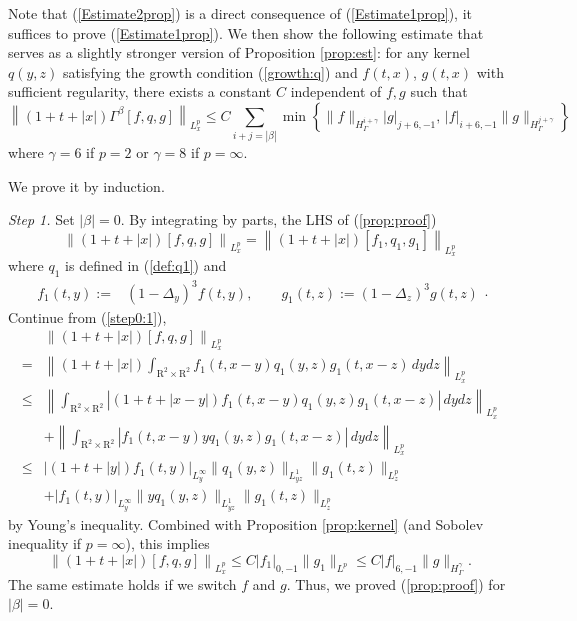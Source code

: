 \documentclass[12pt]{amsart}
\numberwithin{equation}{section} \numberwithin{theorem}{section}
\numberwithin{example}{section} \numberwithin{remark}{section}
\numberwithin{figure}{section} \numberwithin{algorithm}{section}
\def\be{\begin{equation}}
\def\ee{\end{equation}}
\def\mR{\mbox{R}}
\def\Gb{\Gamma^{\beta}}
\def\LGN{|}
\def\RGN#1{|_{#1}}
\def\LGNN{\|}
\def\RGNN#1{\|_{H^{#1}_{\Gamma}}}
\begin{document}
Note that (\ref{Estimate2prop}) is a direct consequence of
(\ref{Estimate1prop}), it suffices to prove (\ref{Estimate1prop}).
We then show the following estimate that serves as a slightly
stronger version of Proposition \ref{prop:est}: for any kernel
$q(y,z)$ satisfying the growth condition (\ref{growth:q}) and
$f(t,x)$, $g(t,x)$ with sufficient regularity, there exists a
constant $C$ independent of $f,g$ such that
\be\label{prop:proof}\left\|(1+t+|x|)\Gb[f,q,g]\right\|_{L^p_x}\le
C\sum_{i+j=|\beta|}\min\left\{\LGNN f\RGNN{i+\gamma}\LGN
g\RGN{j+6,-1},\,\LGN f\RGN{i+6,-1}\LGNN g\RGNN{j+\gamma}\right\}\ee
where $\gamma=6$ if $p=2$ or $\gamma=8$ if $p=\infty$.

We prove it by induction.

\emph{Step 1.} Set $|\beta|=0$. By integrating by parts, the LHS of
(\ref{prop:proof})
\be\label{step0:1}\left\|(1+t+|x|)[f,q,g]\right\|_{L^p_x}
=\left\|(1+t+|x|)[f_1,q_1,g_1]\right\|_{L^p_x}\ee where $q_1$ is defined in (\ref{def:q1}) and
\[\begin{split} f_1(t,y):=&(1-\Delta_y)^3f(t,y),\qquad
g_1(t,z):=(1-\Delta_z)^3g(t,z)\end{split}.\]
Continue from (\ref{step0:1}),
\[\begin{split}
&\left\|(1+t+|x|)[f,q,g]\right\|_{L^p_x}\\
=
&\left\|(1+t+|x|)\int_{\mR^2\times\mR^2}f_1(t,x-y)
q_1(y,z)g_1(t,x-z)\,dydz\right\|_{L^p_x}\\
\le&\left\|\int_{\mR^2\times\mR^2}\left|(1+t+|x-y|)
f_1(t,x-y)q_1(y,z)g_1(t,x-z)\right|\,dydz\right\|_{L^p_x}\\
&+\left\|\int_{\mR^2\times\mR^2}\left|f_1(t,x-y)yq_1(y,z)
g_1(t,x-z)\right|\,dydz\right\|_{L^p_x}\\
\le&\left|(1+t+|y|)f_1(t,y)\right|_{L^\infty_y}\|q_1(y,z)\|_{L^1_{yz}}
\|g_1(t,z)\|_{L^p_z}\\&+\left|f_1(t,y)\right|_{L^\infty_y}
\|yq_1(y,z)\|_{L^1_{yz}}\|g_1(t,z)\|_{L^p_z}
\end{split}\]
by Young's inequality. Combined with Proposition \ref{prop:kernel}
(and Sobolev inequality if $p=\infty$), this
implies\[\left\|(1+t+|x|)[f,q,g]\right\|_{L^p_x}\le C\LGN
f_1\RGN{0,-1}\|g_1\|_{L^p}\le C\LGN f\RGN{6,-1}\LGNN
g\RGNN{\gamma}.\]The same estimate holds if we switch $f$ and $g$.
Thus, we proved (\ref{prop:proof}) for $|\beta|=0$.
\end{document}
